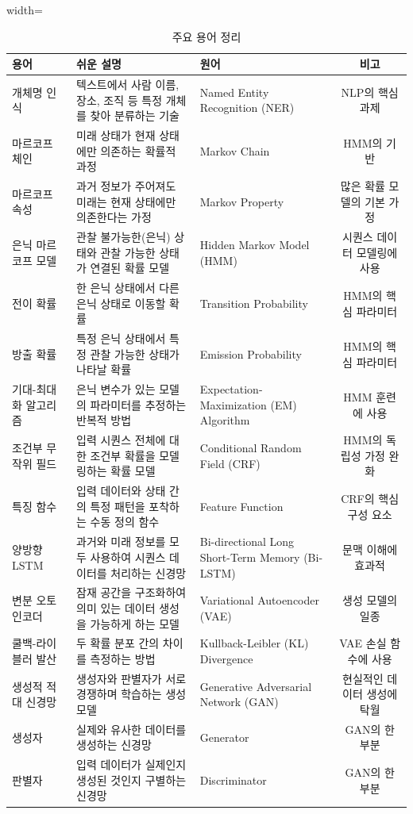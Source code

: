 \documentclass[11pt,a4paper]{article}
\begin{document}
\begin{table}[h!]
\centering
\caption{주요 용어 정리}
\label{tab:glossary}
\begin{adjustbox}{width=\textwidth}
\begin{tabular}{lllc}
\toprule
\textbf{용어} & \textbf{쉬운 설명} & \textbf{원어} & \textbf{비고} \\
\midrule
개체명 인식 & 텍스트에서 사람 이름, 장소, 조직 등 특정 개체를 찾아 분류하는 기술 & Named Entity Recognition (NER) & NLP의 핵심 과제 \\
마르코프 체인 & 미래 상태가 현재 상태에만 의존하는 확률적 과정 & Markov Chain & HMM의 기반 \\
마르코프 속성 & 과거 정보가 주어져도 미래는 현재 상태에만 의존한다는 가정 & Markov Property & 많은 확률 모델의 기본 가정 \\
은닉 마르코프 모델 & 관찰 불가능한(은닉) 상태와 관찰 가능한 상태가 연결된 확률 모델 & Hidden Markov Model (HMM) & 시퀀스 데이터 모델링에 사용 \\
전이 확률 & 한 은닉 상태에서 다른 은닉 상태로 이동할 확률 & Transition Probability & HMM의 핵심 파라미터 \\
방출 확률 & 특정 은닉 상태에서 특정 관찰 가능한 상태가 나타날 확률 & Emission Probability & HMM의 핵심 파라미터 \\
기대-최대화 알고리즘 & 은닉 변수가 있는 모델의 파라미터를 추정하는 반복적 방법 & Expectation-Maximization (EM) Algorithm & HMM 훈련에 사용 \\
조건부 무작위 필드 & 입력 시퀀스 전체에 대한 조건부 확률을 모델링하는 확률 모델 & Conditional Random Field (CRF) & HMM의 독립성 가정 완화 \\
특징 함수 & 입력 데이터와 상태 간의 특정 패턴을 포착하는 수동 정의 함수 & Feature Function & CRF의 핵심 구성 요소 \\
양방향 LSTM & 과거와 미래 정보를 모두 사용하여 시퀀스 데이터를 처리하는 신경망 & Bi-directional Long Short-Term Memory (Bi-LSTM) & 문맥 이해에 효과적 \\
변분 오토인코더 & 잠재 공간을 구조화하여 의미 있는 데이터 생성을 가능하게 하는 모델 & Variational Autoencoder (VAE) & 생성 모델의 일종 \\
쿨백-라이블러 발산 & 두 확률 분포 간의 차이를 측정하는 방법 & Kullback-Leibler (KL) Divergence & VAE 손실 함수에 사용 \\
생성적 적대 신경망 & 생성자와 판별자가 서로 경쟁하며 학습하는 생성 모델 & Generative Adversarial Network (GAN) & 현실적인 데이터 생성에 탁월 \\
생성자 & 실제와 유사한 데이터를 생성하는 신경망 & Generator & GAN의 한 부분 \\
판별자 & 입력 데이터가 실제인지 생성된 것인지 구별하는 신경망 & Discriminator & GAN의 한 부분 \\
\bottomrule
\end{tabular}
\end{adjustbox}
\end{table}
\end{document}
